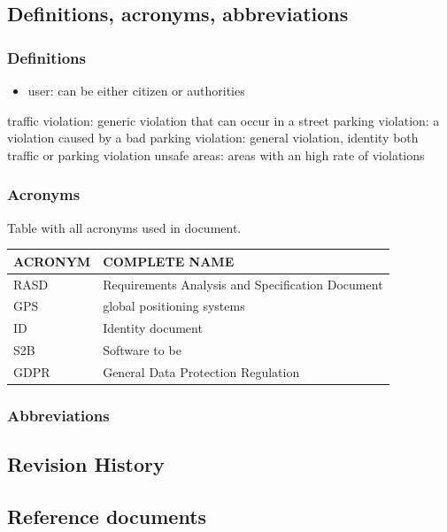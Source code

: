 \documentclass{article}
\begin{document}
\subsection{Definitions, acronyms, abbreviations}

\subsubsection{Definitions}
\begin{itemize}
    \item user: can be either citizen or authorities
\end{itemize}
traffic violation: generic violation that can occur in a street
parking violation: a violation caused by a bad parking
violation: general violation, identity both traffic or parking violation
unsafe areas: areas with an high rate of violations

\subsubsection{Acronyms}
Table with all acronyms used in document.
\begin{center}
\begin{tabular}{ | l | l |}
    \hline
    ACRONYM & COMPLETE NAME \\
    \hline
    RASD & Requirements Analysis and Specification Document \\
    \hline
    GPS & global positioning systems \\
    \hline
    ID & Identity document \\
    \hline
    S2B & Software to be \\
    \hline
    GDPR & General Data Protection Regulation \\
    \hline 
\end{tabular}
\end{center}

\subsubsection{Abbreviations}

\subsection{Revision History}

\subsection{Reference documents}
\end{document}
